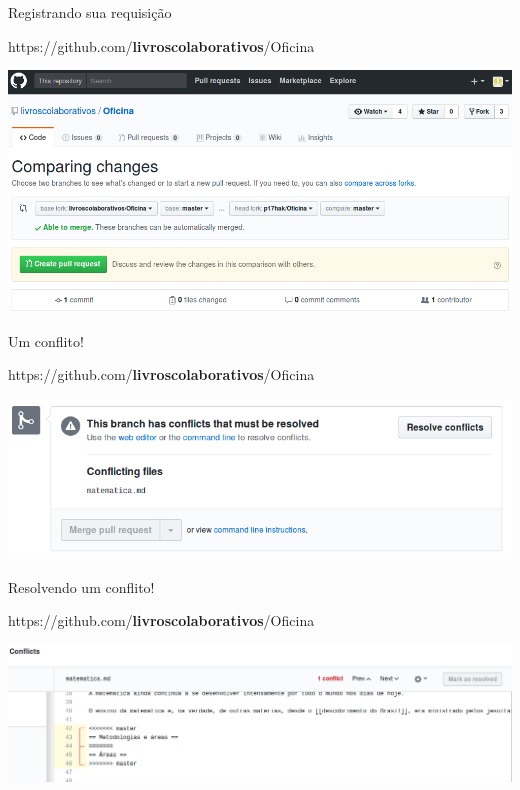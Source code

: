 \documentclass{beamer}
\begin{document}
\begin{frame}{Registrando sua requisição}
  \begin{center}
    https://github.com/{\bf livroscolaborativos}/Oficina

    \includegraphics[scale=0.3]{./figs/Create_pull_request_GitHub.png}
  \end{center}
\end{frame}

\begin{frame}{Um conflito!}
  \begin{center}
    https://github.com/{\bf livroscolaborativos}/Oficina

    \includegraphics[scale=0.3]{./figs/Conflict_GitHub.png}
  \end{center}
\end{frame}

\begin{frame}{Resolvendo um conflito!}
  \begin{center}
    https://github.com/{\bf livroscolaborativos}/Oficina

    \includegraphics[scale=0.3]{./figs/Mark_as_resolved_GitHub.png}
  \end{center}
\end{frame}
\end{document}
